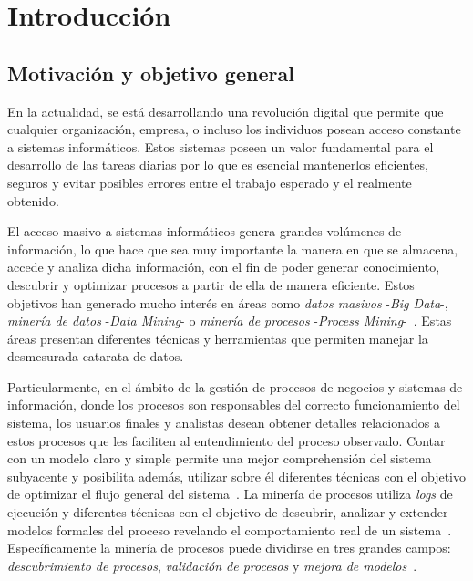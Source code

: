 \chapter{Introducción}
\label{chap:1}

\section{Motivación y objetivo general}
\label{sec:mot}

En la actualidad, se está desarrollando una revolución digital que permite que cualquier organización, empresa,
o incluso los individuos posean acceso constante a sistemas informáticos. Estos sistemas poseen un valor fundamental
para el desarrollo de las tareas diarias por lo que es esencial mantenerlos eficientes, seguros y evitar posibles
errores entre el trabajo esperado y el realmente obtenido.

El acceso masivo a sistemas informáticos genera grandes volúmenes de información, lo que hace que sea muy importante
la manera en que se almacena, accede y analiza dicha información, con el fin de poder generar conocimiento,
descubrir y optimizar procesos a partir de ella de manera eficiente. 
Estos objetivos han generado mucho interés en áreas como \textit{datos masivos} -\textit{Big Data}-,
\textit{minería de datos} -\textit{Data Mining}- o \textit{minería de procesos} -\textit{Process Mining}-~\cite{Rozi07,AalstBook}.
Estas áreas presentan diferentes técnicas y herramientas que permiten manejar la desmesurada catarata de datos.

Particularmente, en el ámbito de la gestión de procesos de negocios y sistemas de información, donde los procesos son 
responsables del correcto funcionamiento del sistema, los usuarios finales y analistas desean obtener
detalles relacionados a estos procesos que les faciliten al entendimiento del proceso observado.
Contar con un modelo claro y simple permite una mejor comprehensión del sistema 
subyacente y posibilita además, utilizar sobre él diferentes técnicas con el objetivo de optimizar
el flujo general del sistema~\cite{Aalst2012}.
La minería de procesos utiliza \textit{logs} de ejecución y diferentes técnicas con el objetivo de descubrir,
analizar y extender modelos formales del proceso revelando el comportamiento real de un sistema~\cite{AalstBook}.
Específicamente la minería de procesos puede dividirse en tres grandes campos: \textit{descubrimiento de procesos},
\textit{validación de procesos} y \textit{mejora de modelos}~\cite{Aalst2004,AalstBook,FahlandA15}.


